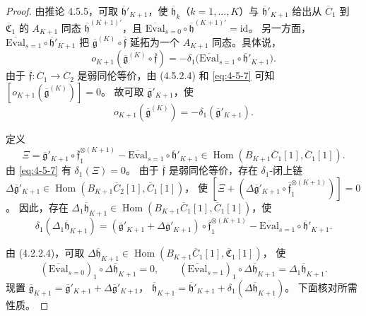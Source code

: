 \begin{proof}
由推论 4.5.5，可取
$\overline{\mathfrak h}'_{K+1}$，使
$\overline{\mathfrak h}_k$（$k=1,\ldots,K$）与
$\overline{\mathfrak h}'_{K+1}$ 给出从
$\overline C_1$ 到 $\overline{\mathfrak C}_1$
的 $A_{K+1}$ 同态
$\overline{\mathfrak h}^{(K+1)\prime}$，且
$\overline{\mathrm{Eval}}_{s=0}
\circ\overline{\mathfrak h}^{(K+1)\prime}
=\mathrm{id}$。
另一方面，
$\overline{\mathrm{Eval}}_{s=1}
\circ\overline{\mathfrak h}'_{K+1}$
把
$\overline{\mathfrak g}^{(K)}
\circ\overline{\mathfrak f}$
延拓为一个 $A_{K+1}$ 同态。具体说，
\begin{equation}
 o_{K+1}(\overline{\mathfrak g}^{(K)}
          \circ\overline{\mathfrak f})
 =-\delta_1\bigl(
   \overline{\mathrm{Eval}}_{s=1}
   \circ\overline{\mathfrak h}'_{K+1}\bigr).
\tag{4.5.7}\label{eq:4-5-7}
\end{equation}
由于 $\overline{\mathfrak f}\colon\overline C_1\to\overline C_2$
是弱同伦等价，由 (4.5.2.4) 和 \eqref{eq:4-5-7} 可知
$[o_{K+1}(\overline{\mathfrak g}^{(K)})]=0$。
故可取 $\overline{\mathfrak g}'_{K+1}$，使
\begin{equation}
 o_{K+1}(\overline{\mathfrak g}^{(K)})
 =-\delta_1(\overline{\mathfrak g}'_{K+1}).
\tag{4.5.8}\label{eq:4-5-8}
\end{equation}

定义
\[
 \Xi=
 \overline{\mathfrak g}'_{K+1}
 \circ\overline{\mathfrak f}_1^{\otimes(K+1)}
 -\overline{\mathrm{Eval}}_{s=1}
 \circ\overline{\mathfrak h}'_{K+1}
 \in\operatorname{Hom}
 (B_{K+1}\overline C_1[1],\overline C_1[1]).
\]
由 \eqref{eq:4-5-7} 有 $\delta_1(\Xi)=0$。
由于 $\overline{\mathfrak f}$ 是弱同伦等价，存在
$\delta_1$-闭上链
$\Delta\overline{\mathfrak g}'_{K+1}\in
\operatorname{Hom}(B_{K+1}\overline C_2[1],\overline C_1[1])$，
使
$[\Xi+
(\Delta\overline{\mathfrak g}'_{K+1}
\circ\overline{\mathfrak f}_1^{\otimes(K+1)})]=0$。
因此，存在
$\Delta_1\overline{\mathfrak h}_{K+1}
\in\operatorname{Hom}
(B_{K+1}\overline C_1[1],\overline C_1[1])$，使
\begin{equation}
 \delta_1(\Delta_1\overline{\mathfrak h}_{K+1})
 =(\overline{\mathfrak g}'_{K+1}
   +\Delta\overline{\mathfrak g}'_{K+1})
   \circ\overline{\mathfrak f}_1^{\otimes(K+1)}
  -\overline{\mathrm{Eval}}_{s=1}
   \circ\overline{\mathfrak h}'_{K+1}.
\tag{4.5.9}\label{eq:4-5-9}
\end{equation}

由 (4.2.2.4)，可取
$\Delta\overline{\mathfrak h}_{K+1}
\in\operatorname{Hom}
(B_{K+1}\overline C_1[1],\overline{\mathfrak C}_1[1])$，
使
\begin{equation}
 (\overline{\mathrm{Eval}}_{s=0})_1
  \circ\Delta\overline{\mathfrak h}_{K+1}=0,
 \qquad
 (\overline{\mathrm{Eval}}_{s=1})_1
  \circ\Delta\overline{\mathfrak h}_{K+1}
  =\Delta_1\overline{\mathfrak h}_{K+1}.
\tag{4.5.10}\label{eq:4-5-10}
\end{equation}
现置
$\overline{\mathfrak g}_{K+1}
=\overline{\mathfrak g}'_{K+1}
+\Delta\overline{\mathfrak g}'_{K+1}$，
$\overline{\mathfrak h}_{K+1}
=\overline{\mathfrak h}'_{K+1}
+\delta_1(\Delta\overline{\mathfrak h}_{K+1})$。
下面核对所需性质。


\end{proof}
